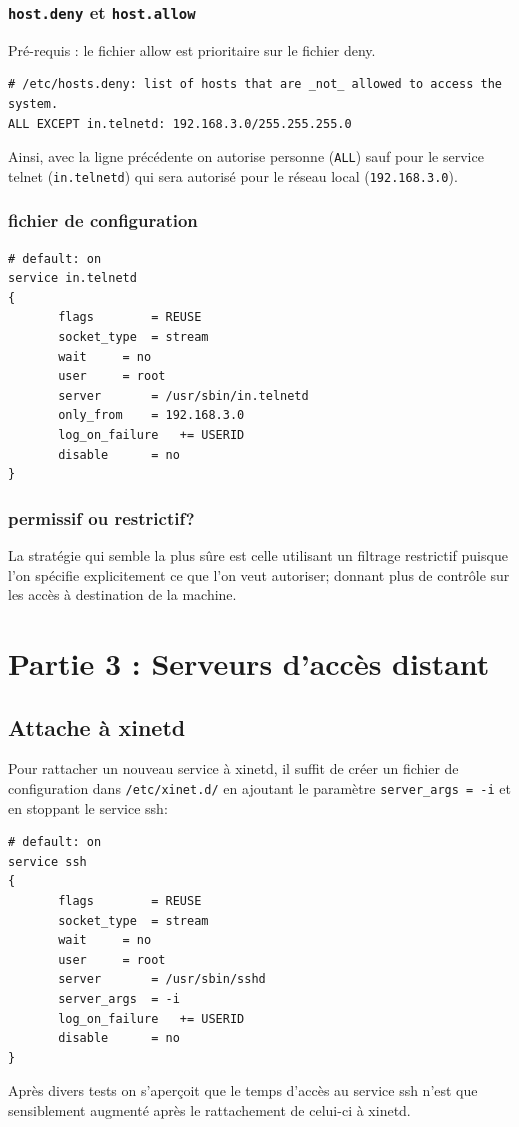 \documentclass[12pt,a4paper,notitlepage]{article}
\begin{document}
\subsubsection{\texttt{host.deny} et \texttt{host.allow}}

\noindent Pré-requis : le fichier allow est prioritaire sur le fichier deny.\\

\begin{lstlisting}
# /etc/hosts.deny: list of hosts that are _not_ allowed to access the system.
ALL EXCEPT in.telnetd: 192.168.3.0/255.255.255.0
\end{lstlisting}
Ainsi, avec la ligne précédente on autorise personne (\texttt{ALL}) sauf pour le service telnet (\texttt{in.telnetd}) qui sera autorisé pour le réseau local (\texttt{192.168.3.0}).


\subsubsection{fichier de configuration}

\begin{lstlisting}
# default: on
service in.telnetd
{
       flags		= REUSE
       socket_type	= stream
       wait		= no
       user		= root
       server		= /usr/sbin/in.telnetd
       only_from	= 192.168.3.0
       log_on_failure	+= USERID
       disable		= no
}
\end{lstlisting}

\subsubsection{permissif ou restrictif?}



La stratégie qui semble la plus sûre est celle utilisant un filtrage restrictif puisque l'on spécifie explicitement ce que l'on veut autoriser; donnant plus de contrôle sur les accès à destination de la machine.


\section{Partie 3 : Serveurs d'accès distant}

\subsection{Attache à xinetd}

Pour rattacher un nouveau service à xinetd, il suffit de créer un fichier de configuration dans \texttt{/etc/xinet.d/} en ajoutant le paramètre \texttt{server\_args = -i} et en stoppant le service ssh: \\

\begin{lstlisting}
# default: on
service ssh
{
       flags		= REUSE
       socket_type	= stream
       wait		= no
       user		= root
       server		= /usr/sbin/sshd
       server_args	= -i
       log_on_failure	+= USERID
       disable		= no
}
\end{lstlisting}

Après divers tests on s'aperçoit que le temps d'accès au service ssh n'est que sensiblement augmenté après le rattachement de celui-ci à xinetd.
\end{document}
